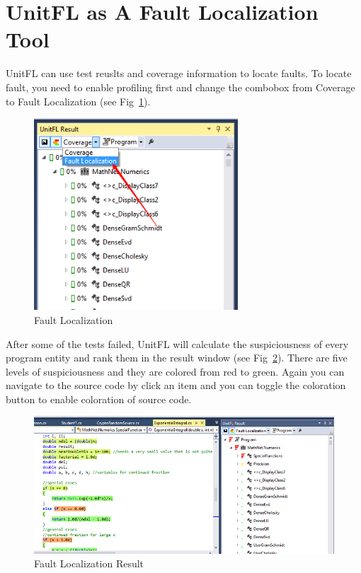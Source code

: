 \documentclass[11pt]{article} %
\begin{document}
\section{UnitFL as A Fault Localization Tool}
UnitFL can use test reuslts and coverage information to locate faults. To locate fault, you need to enable profiling first and
change the combobox from Coverage to Fault Localization (see Fig~\ref{fault_localization}).

\begin{figure}
	\centering
	\includegraphics[width=3in]{fault_localization}
	\caption{Fault Localization}
	\label{fault_localization}
\end{figure}

After some of the tests failed, UnitFL will calculate the suspiciousness of every program entity and rank them in the result window (see Fig~\ref{fault_localization_result}).
There are five levels of suspiciousness and they are colored from red to green. Again you can navigate to the source code by click an item and you can toggle the coloration button
to enable coloration of source code.

\begin{figure}
	\centering
	\includegraphics[width=6in]{fault_localization_result}
	\caption{Fault Localization Result}
	\label{fault_localization_result}
\end{figure}
\end{document}
